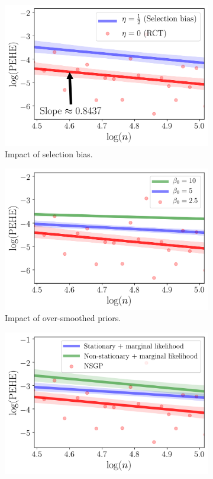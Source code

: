 \documentclass [PhD] {uclathes}
\begin{document}
\begin{figure}[t]
\centering
\begin{subfigure}{.33\textwidth}
  \centering
  \includegraphics[width=0.9\linewidth]{ch2Fig2.png}
  \caption{\footnotesize Impact of selection bias.}
  \label{Ahmed1}
\end{subfigure}%
\begin{subfigure}{.33\textwidth}
  \centering
  \includegraphics[width=0.9\linewidth]{ch2Fig3.png}
  \caption{\footnotesize Impact of over-smoothed priors.}
  \label{Ahmed2}
\end{subfigure}
\begin{subfigure}{.33\textwidth}
  \centering
  \includegraphics[width=0.9\linewidth]{ch2Fig4.png}

\end{subfigure}
\end{figure}
\end{document}
